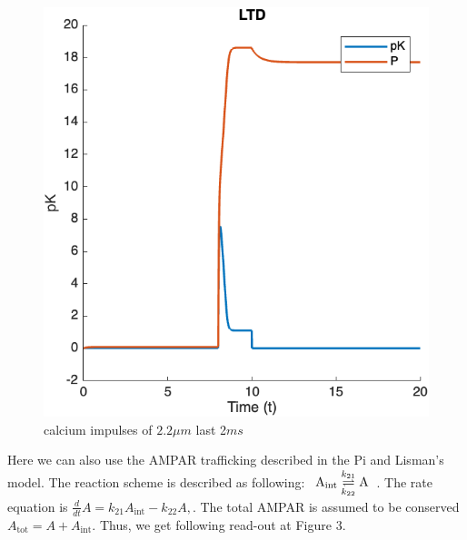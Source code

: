 \documentclass{article}
\begin{document}
\begin{figure}[h]
\begin{minipage}[b]{0.45\textwidth}
        \includegraphics[width=\textwidth]{fig2.png}
        \caption{calcium impulses of $2.2 \mu m$ last 2$ms$}
        \label{fig:image2}
    \end{minipage}
\end{figure}
\linebreak
Here we can also use the AMPAR trafficking described in the Pi and Lisman's model. The reaction scheme is described as following:
$\begin{array}{c}
\ce{A_{int}} \underset{k_{22}}{\overset{k_{21}}{\rightleftharpoons}} \ce{A}
\end{array}$. The rate equation is \(
\frac{d}{dt}A = k_{21}A_{\text{int}} - k_{22}A,
\). The total AMPAR is assumed to be conserved \(A_{\text{tot}} = A + A_{\text{int}}\). Thus, we get following read-out at Figure 3.
\end{document}
